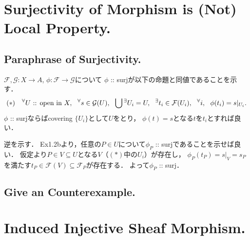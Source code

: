 \documentclass[a4paper]{jsarticle}
\newcommand{\shF}{\mathcal{F}}
\newcommand{\shG}{\mathcal{G}}
\begin{document}
    \section{Surjectivity of Morphism is (Not) Local Property.} %
    \subsection{Paraphrase of Surjectivity.}
    $\shF, \shG: X \to A$, $\phi: \shF \to \shG$について
    $\phi$ :: surjが以下の命題と同値であることを示す．
    \[
        (*)~~~
        \Forall{U \text{ :: open in } X}
        \Forall{s \in \shG(U)}
        \bigcup {}^\exists U_i=U,~~
        \Exists{t_i \in \shF(U_i)}
        \Forall{i} \phi(t_i)=s|_{U_i}.
    \]
    $\phi$ :: surjならばcovering $\{U_i\}$として$U$をとり，
    $\phi(t)=s$となる$t$を$t_i$とすれば良い．

    逆を示す．
    Ex1.2bより，任意の$P \in U$について$\phi_P$ :: surjであることを示せば良い．
    仮定より$P \in V \subseteq U$となる$V$（$(*)$中の$U_i$）が存在し，
    $\phi_P(t_P)=s|_V=s_P$を満たす$t_P \in \shF(V) \subseteq \shF_P$が存在する．
    よって$\phi_P$ :: surj．

    \subsection{Give an Counterexample.}



\section{Induced Injective Sheaf Morphism.} %
\end{document}
